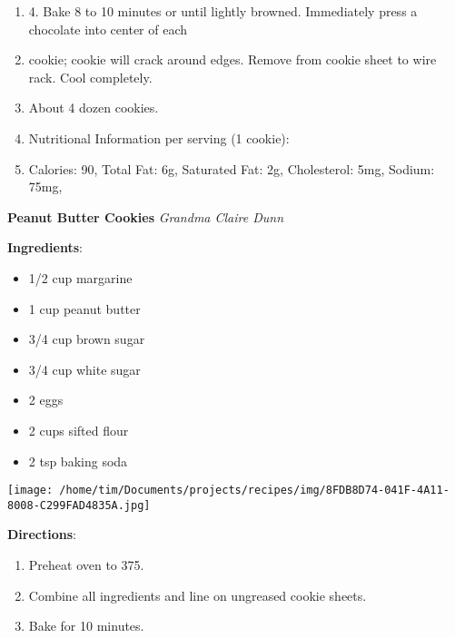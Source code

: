 \documentclass[11pt, twoside, openany]{book}
\begin{document}
\begin{minipage}[t]{\linewidth}
\begin{enumerate}
\item 4. Bake 8 to 10 minutes or until lightly browned. Immediately press a chocolate into center of each
\item cookie; cookie will crack around edges. Remove from cookie sheet to wire rack. Cool completely.
\item About 4 dozen cookies.
\item Nutritional Information per serving (1 cookie):
\item Calories: 90, Total Fat: 6g, Saturated Fat: 2g, Cholesterol: 5mg, Sodium: 75mg,
\end{enumerate}
\end{minipage}\vspace{8mm}
\noindent\begin{minipage}[t]{\linewidth}%
{\Large\textbf{Peanut Butter Cookies}} \label{peanut-butter-cookies}\hfill\textit{Grandma Claire Dunn}\\
\noindent\begin{minipage}[t]{0.78\linewidth}%
\textbf{Ingredients}:\vspace{-3mm}
\begin{multicols}{2}
\begin{itemize}\setlength\itemsep{-1mm}
\item 1/2 cup margarine
\item 1 cup peanut butter
\item 3/4 cup brown sugar
\item 3/4 cup white sugar
\item 2 eggs
\item 2 cups sifted flour
\item 2 tsp baking soda
\end{itemize}
\end{multicols}
\end{minipage}
\noindent\begin{minipage}[t]{0.18\linewidth}
\centering \strut\vspace*{-\baselineskip}\newline
\texttt{[image: /home/tim/Documents/projects/recipes/img/8FDB8D74-041F-4A11-8008-C299FAD4835A.jpg]}\\
\end{minipage}\vspace{3mm}
\textbf{Directions}:
\vspace{-3mm}\begin{enumerate}\setlength\itemsep{-1mm}
\item Preheat oven to 375.
\item Combine all ingredients and line on ungreased cookie sheets.
\item Bake for 10 minutes.
\end{enumerate}
\end{minipage}\vspace{8mm}
\end{document}
